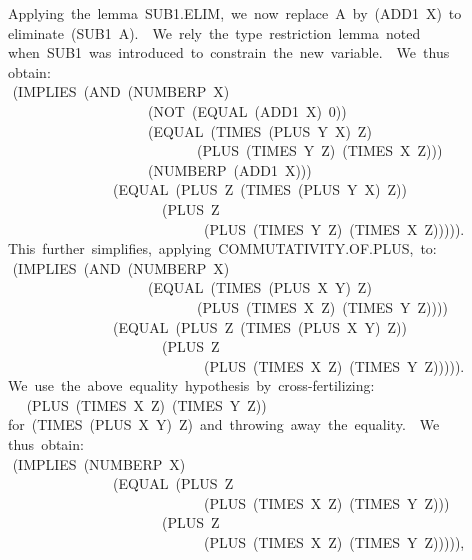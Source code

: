 \documentclass[10pt]{book}
\newenvironment{pubasis}{\begin{flushleft}}{\end{flushleft}}
\begin{document}
\begin{pubasis}
~~~~Applying~the~lemma~SUB1.ELIM,~we~now~replace~A~by~(ADD1~X)~to\\
~~~~eliminate~(SUB1~A).~~We~rely~the~type~restriction~lemma~noted\\
~~~~when~SUB1~was~introduced~to~constrain~the~new~variable.~~We~thus\\
~~~~obtain:\\

~~	~~(IMPLIES~(AND~(NUMBERP~X)\\
~~~~~~~~~~~~~~~~~~~~~~~~(NOT~(EQUAL~(ADD1~X)~0))\\
~~~~~~~~~~~~~~~~~~~~~~~~(EQUAL~(TIMES~(PLUS~Y~X)~Z)\\
~~~~~~~~~~~~~~~~~~~~~~~~~~~~~~~(PLUS~(TIMES~Y~Z)~(TIMES~X~Z)))\\
~~~~~~~~~~~~~~~~~~~~~~~~(NUMBERP~(ADD1~X)))\\
~~~~~~~~~~~~~~~~~~~(EQUAL~(PLUS~Z~(TIMES~(PLUS~Y~X)~Z))\\
~~~~~~~~~~~~~~~~~~~~~~~~~~(PLUS~Z\\
~~~~~~~~~~~~~~~~~~~~~~~~~~~~~~~~(PLUS~(TIMES~Y~Z)~(TIMES~X~Z))))).\\

~~~~This~further~simplifies,~applying~COMMUTATIVITY.OF.PLUS,~to:\\

~~	~~(IMPLIES~(AND~(NUMBERP~X)\\
~~~~~~~~~~~~~~~~~~~~~~~~(EQUAL~(TIMES~(PLUS~X~Y)~Z)\\
~~~~~~~~~~~~~~~~~~~~~~~~~~~~~~~(PLUS~(TIMES~X~Z)~(TIMES~Y~Z))))\\
~~~~~~~~~~~~~~~~~~~(EQUAL~(PLUS~Z~(TIMES~(PLUS~X~Y)~Z))\\
~~~~~~~~~~~~~~~~~~~~~~~~~~(PLUS~Z\\
~~~~~~~~~~~~~~~~~~~~~~~~~~~~~~~~(PLUS~(TIMES~X~Z)~(TIMES~Y~Z))))).\\

~~~~We~use~the~above~equality~hypothesis~by~cross-fertilizing:\\
~~~~	~~(PLUS~(TIMES~X~Z)~(TIMES~Y~Z))\\
~~~~for~(TIMES~(PLUS~X~Y)~Z)~and~throwing~away~the~equality.~~We\\
~~~~thus~obtain:\\

~~	~~(IMPLIES~(NUMBERP~X)\\
~~~~~~~~~~~~~~~~~~~(EQUAL~(PLUS~Z\\
~~~~~~~~~~~~~~~~~~~~~~~~~~~~~~~~(PLUS~(TIMES~X~Z)~(TIMES~Y~Z)))\\
~~~~~~~~~~~~~~~~~~~~~~~~~~(PLUS~Z\\
~~~~~~~~~~~~~~~~~~~~~~~~~~~~~~~~(PLUS~(TIMES~X~Z)~(TIMES~Y~Z))))),\\


\end{pubasis}
\end{document}
